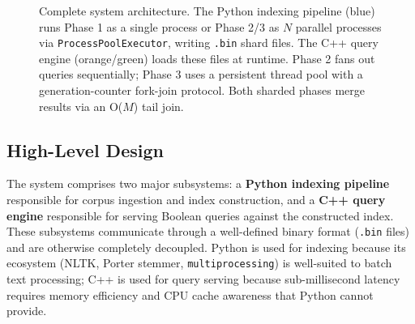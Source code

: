 \documentclass[twocolumn, 10pt]{article}
\begin{document}
\begin{figure}[t]
\caption{Complete system architecture. The Python indexing pipeline (blue) runs
         Phase 1 as a single process or Phase 2/3 as $N$ parallel processes via
         \texttt{ProcessPoolExecutor}, writing \texttt{.bin} shard files.
         The C++ query engine (orange/green) loads these files at runtime.
         Phase 2 fans out queries sequentially; Phase 3 uses a persistent thread
         pool with a generation-counter fork-join protocol. Both sharded phases
         merge results via an O($M$) tail join.}
\label{fig:arch}
\end{figure}

\subsection{High-Level Design}

The system comprises two major subsystems: a \textbf{Python indexing
pipeline} responsible for corpus ingestion and index construction, and a
\textbf{C++ query engine} responsible for serving Boolean queries against
the constructed index. These subsystems communicate through a well-defined
binary format (\texttt{.bin} files) and are otherwise completely decoupled.
Python is used for indexing because its ecosystem (NLTK, Porter stemmer,
\texttt{multiprocessing}) is well-suited to batch text processing; C++ is
used for query serving because sub-millisecond latency requires memory
efficiency and CPU cache awareness that Python cannot provide.
\end{document}
